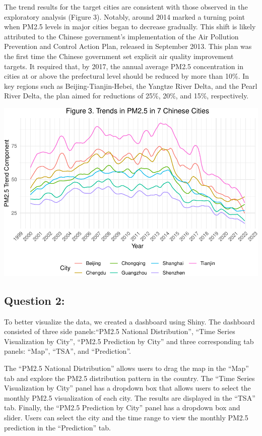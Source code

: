 \documentclass[
  12pt,
]{article}
\begin{document}
The trend results for the target cities are consistent with those
observed in the exploratory analysis (Figure 3). Notably, around 2014
marked a turning point when PM2.5 levels in major cities began to
decrease gradually. This shift is likely attributed to the Chinese
government's implementation of the Air Pollution Prevention and Control
Action Plan, released in September 2013. This plan was the first time
the Chinese government set explicit air quality improvement targets. It
required that, by 2017, the annual average PM2.5 concentration in cities
at or above the prefectural level should be reduced by more than 10\%.
In key regions such as Beijing-Tianjin-Hebei, the Yangtze River Delta,
and the Pearl River Delta, the plan aimed for reductions of 25\%, 20\%,
and 15\%, respectively.

\includegraphics{LiFangRenZhang_ENV872_Project_files/figure-latex/trend figure-1.pdf}

\hypertarget{question-2}{%
\subsection{Question 2:}\label{question-2}}

To better visualize the data, we created a dashboard using Shiny. The
dashboard consisted of three side panels:``PM2.5 National
Distribution'', ``Time Series Visualization by City'', ``PM2.5
Prediction by City'' and three corresponding tab panels: ``Map'',
``TSA'', and ``Prediction''.

The ``PM2.5 National Distribution'' allows users to drag the map in the
``Map'' tab and explore the PM2.5 distribution pattern in the country.
The ``Time Series Visualization by City'' panel has a dropdown box that
allows users to select the monthly PM2.5 visualization of each city. The
results are displayed in the ``TSA'' tab. Finally, the ``PM2.5
Prediction by City'' panel has a dropdown box and slider. Users can
select the city and the time range to view the monthly PM2.5 prediction
in the ``Prediction'' tab.
\end{document}
